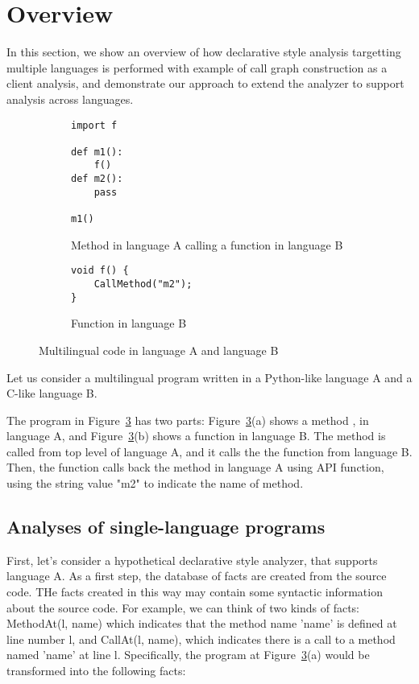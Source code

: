 \section{Overview}
In this section, we show an overview of how declarative style analysis
targetting multiple languages is performed with example of call graph
construction as a client analysis, and demonstrate our approach to extend the
analyzer to support analysis across languages.

\begin{figure}[t]
  \centering
  \vspace{2mm}
  \begin{subfigure}[t]{0.5\textwidth}
    \begin{lstlisting}[style=java,xleftmargin=2.5em]
import f

def m1():
    f()
def m2():
    pass

m1()
    \end{lstlisting}
    \vspace*{-.5em}
    \caption{Method in language A calling a function in language B}
    \label{fig:exam:langA}
  \end{subfigure}
  \begin{subfigure}[t]{0.5\textwidth}
    \begin{lstlisting}[style=cpp,firstnumber=9,xleftmargin=2.5em]
void f() {
    CallMethod("m2");
}
    \end{lstlisting}
    \vspace*{-.5em}
    \caption{Function in language B}
    \label{fig:exam:langB}
  \end{subfigure}
  \vspace*{-.5em}
  \caption{Multilingual code in language A and language B}
  \label{fig:exam}
\end{figure}

Let us consider a multilingual program written in a Python-like language A
and a C-like language B.

The program in Figure~\ref{fig:exam} has two parts: Figure~\ref{fig:exam}(a)
shows a method ,  in language A, and
Figure~\ref{fig:exam}(b) shows a function  in language B.  The method
 is called from top level of language A, and it calls the the
function  from language B.  Then, the function  calls back
the method  in language A using API function, using the string
value "m2" to indicate the name of method.

\subsection{Analyses of single-language programs}
First, let's consider a hypothetical declarative style analyzer, that supports
language A.  As a first step, the database of facts are created from the source
code. THe facts created in this way may contain some syntactic information
about the source code. For example, we can think of two kinds of facts:
MethodAt(l, name) which indicates that the method name 'name' is defined at
line number l, and CallAt(l, name), which indicates there is a call to a method
named 'name' at line l.  Specifically, the program at Figure~\ref{fig:exam}(a)
would be transformed into the following facts:

